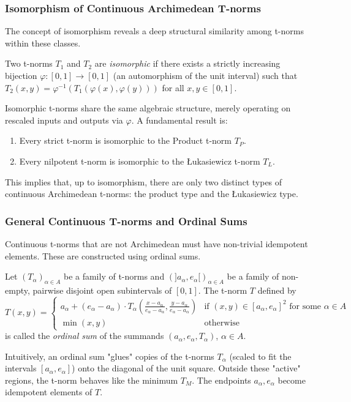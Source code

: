 \subsubsection{Isomorphism of Continuous Archimedean T-norms}
The concept of isomorphism reveals a deep structural similarity among t-norms within these classes.
\begin{definition}
  Two t-norms $T_1$ and $T_2$ are \emph{isomorphic} if there exists a strictly increasing bijection $\varphi: [0,1] \to [0,1]$ (an automorphism of the unit interval) such that $T_2(x,y) = \varphi^{-1}(T_1(\varphi(x), \varphi(y)))$ for all $x,y \in [0,1]$.
\end{definition}
Isomorphic t-norms share the same algebraic structure, merely operating on rescaled inputs and outputs via $\varphi$. A fundamental result is:
\begin{proposition}
  \begin{enumerate}
      \item Every strict t-norm is isomorphic to the Product t-norm $T_P$.
      \item Every nilpotent t-norm is isomorphic to the Łukasiewicz t-norm $T_L$.
  \end{enumerate}
\end{proposition}
This implies that, up to isomorphism, there are only two distinct types of continuous Archimedean t-norms: the product type and the Łukasiewicz type.

\subsubsection{General Continuous T-norms and Ordinal Sums}
Continuous t-norms that are not Archimedean must have non-trivial idempotent elements. These are constructed using ordinal sums.
\begin{definition}
Let $(T_\alpha)_{\alpha \in A}$ be a family of t-norms and $(]a_\alpha, e_\alpha[)_{\alpha \in A}$ be a family of non-empty, pairwise disjoint open subintervals of $[0,1]$. The t-norm $T$ defined by
\[
T(x,y) =
\begin{cases}
  a_\alpha + (e_\alpha - a_\alpha) \cdot T_\alpha \left( \frac{x-a_\alpha}{e_\alpha - a_\alpha}, \frac{y-a_\alpha}{e_\alpha - a_\alpha} \right) & \text{if } (x,y) \in [a_\alpha, e_\alpha]^2 \text{ for some } \alpha \in A \\
  \min(x,y) & \text{otherwise}
\end{cases}
\]
is called the \emph{ordinal sum} of the summands $(a_\alpha, e_\alpha, T_\alpha)$, $\alpha \in A$.
\end{definition}
Intuitively, an ordinal sum "glues" copies of the t-norms $T_\alpha$ (scaled to fit the intervals $[a_\alpha, e_\alpha]$) onto the diagonal of the unit square. Outside these "active" regions, the t-norm behaves like the minimum $T_M$. The endpoints $a_\alpha, e_\alpha$ become idempotent elements of $T$.

